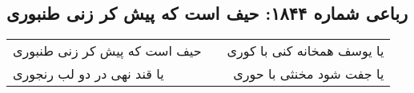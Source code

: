 \begin{center}
\section*{رباعی شماره ۱۸۴۴: حیف است که پیش کر زنی طنبوری}
\label{sec:1844}
\begin{longtable}{l p{0.5cm} r}
حیف است که پیش کر زنی طنبوری
&&
یا یوسف همخانه کنی با کوری
\\
یا قند نهی در دو لب رنجوری
&&
یا جفت شود مخنثی با حوری
\\
\end{longtable}
\end{center}
